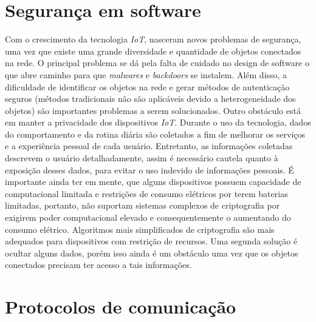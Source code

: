 \documentclass[../../layout.tex]{subfiles}
\begin{document}
\section{Segurança em software}
\hspace*{3em}Com o crescimento da tecnologia \emph{IoT}, nasceram novos problemas de segurança, uma vez que existe uma grande diversidade e quantidade de objetos conectados na rede. O principal problema se dá pela falta de cuidado no design de software o que abre caminho para que \emph{malwares} e \emph{backdoors} se instalem. Além disso, a dificuldade de identificar os objetos na rede e gerar métodos de autenticação seguros (métodos tradicionais não são aplicáveis devido a heterogeneidade dos objetos) são importantes problemas a serem solucionados. Outro obstáculo está em manter a privacidade dos dispositivos \emph{IoT}. Durante o uso da tecnologia, dados do comportamento e da rotina diária são coletados a fim de melhorar os serviços e a experiência pessoal de cada usuário. Entretanto, as informações coletadas descrevem o usuário detalhadamente, assim é necessário cautela quanto à exposição desses dados, para evitar o uso indevido de informações pessoais. 
É importante ainda ter em mente, que alguns dispositivos possuem capacidade de computacional limitada e restrições de consumo elétricos por terem  baterias limitadas, portanto, não suportam  sistemas complexos de criptografia por exigirem poder computacional elevado e consequentemente o aumentando do consumo elétrico. Algoritmos mais simplificados de criptografia são mais adequados para dispositivos com restrição de recursos. Uma segunda solução é ocultar alguns dados, porém isso ainda é um obstáculo uma vez que os objetos conectados precisam ter acesso a tais informações. \cite{seguranca}

\section{Protocolos de comunicação}
\end{document}
